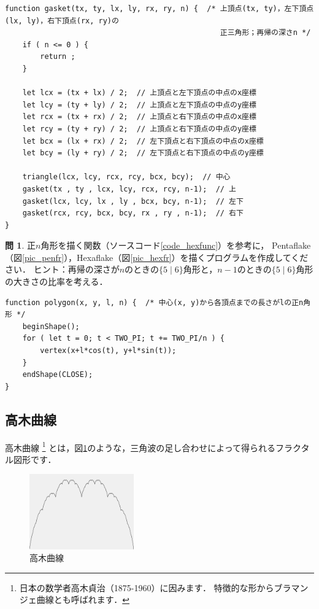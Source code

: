 \documentclass[dvipdfmx]{jsarticle}
\theoremstyle{definition}
\newtheorem{question}{問}[section]
\begin{document}
\begin{lstlisting}[caption=Sierpinskiのギャスケットを描く再帰関数, label=code_gasket]
function gasket(tx, ty, lx, ly, rx, ry, n) {  /* 上頂点(tx, ty)，左下頂点(lx, ly)，右下頂点(rx, ry)の
                                                 正三角形；再帰の深さn */
    if ( n <= 0 ) {
        return ;
    }

    let lcx = (tx + lx) / 2;  // 上頂点と左下頂点の中点のx座標
    let lcy = (ty + ly) / 2;  // 上頂点と左下頂点の中点のy座標
    let rcx = (tx + rx) / 2;  // 上頂点と右下頂点の中点のx座標
    let rcy = (ty + ry) / 2;  // 上頂点と右下頂点の中点のy座標
    let bcx = (lx + rx) / 2;  // 左下頂点と右下頂点の中点のx座標
    let bcy = (ly + ry) / 2;  // 左下頂点と右下頂点の中点のy座標

    triangle(lcx, lcy, rcx, rcy, bcx, bcy);  // 中心
    gasket(tx , ty , lcx, lcy, rcx, rcy, n-1);  // 上
    gasket(lcx, lcy, lx , ly , bcx, bcy, n-1);  // 左下
    gasket(rcx, rcy, bcx, bcy, rx , ry , n-1);  // 右下
}
\end{lstlisting}

\begin{question}
    正$n$角形を描く関数（ソースコード\ref{code_hexfunc}）を参考に，
    Pentaflake（図\ref{pic_penfr}），Hexaflake（図\ref{pic_hexfr}）を描くプログラムを作成してください．
    ヒント：再帰の深さが$n$のときの$\{5\mid6\}$角形と，$n-1$のときの$\{5\mid6\}$角形の大きさの比率を考える．
\end{question}

\clearpage

\begin{lstlisting}[caption=正六角形を描く関数, label=code_hexfunc]
function polygon(x, y, l, n) {  /* 中心(x, y)から各頂点までの長さがlの正n角形 */
    beginShape();
    for ( let t = 0; t < TWO_PI; t += TWO_PI/n ) {
        vertex(x+l*cos(t), y+l*sin(t));
    }
    endShape(CLOSE);
}
\end{lstlisting}

\subsection{高木曲線}  \label{subsec_takagi_curve}
高木曲線
\footnote{
    日本の数学者高木貞治（1875-1960）に因みます．
    特徴的な形からブラマンジェ曲線とも呼ばれます．
}
とは，図\ref{pic_takagi_curve}のような，三角波の足し合わせによって得られるフラクタル図形です．
%
\begin{figure}[H]
    \centering
    \includegraphics[width=0.4\textwidth]{figure/takagi/takagi_curve.png}
    \caption{高木曲線}
    \label{pic_takagi_curve}
\end{figure}
\end{document}
